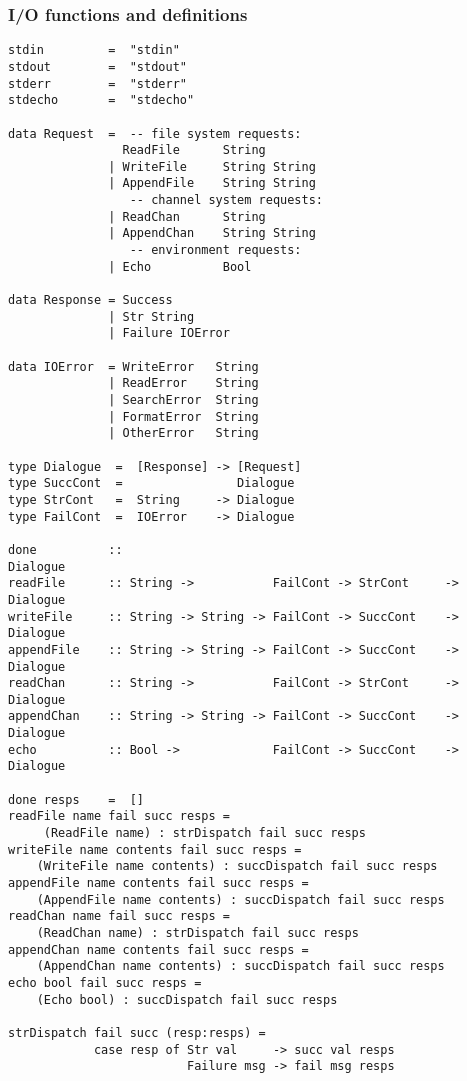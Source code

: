 \subsubsection*{I/O functions and definitions}
\begin{verbatim}
stdin         =  "stdin"
stdout        =  "stdout"
stderr        =  "stderr"
stdecho       =  "stdecho"

data Request  =  -- file system requests:
                ReadFile      String         
              | WriteFile     String String
              | AppendFile    String String
                 -- channel system requests:
              | ReadChan      String 
              | AppendChan    String String
                 -- environment requests:
              | Echo          Bool

data Response = Success
              | Str String 
              | Failure IOError

data IOError  = WriteError   String
              | ReadError    String
              | SearchError  String
              | FormatError  String
              | OtherError   String

type Dialogue  =  [Response] -> [Request]
type SuccCont  =                Dialogue
type StrCont   =  String     -> Dialogue
type FailCont  =  IOError    -> Dialogue
 
done          ::                                                Dialogue
readFile      :: String ->           FailCont -> StrCont     -> Dialogue
writeFile     :: String -> String -> FailCont -> SuccCont    -> Dialogue
appendFile    :: String -> String -> FailCont -> SuccCont    -> Dialogue
readChan      :: String ->           FailCont -> StrCont     -> Dialogue
appendChan    :: String -> String -> FailCont -> SuccCont    -> Dialogue
echo          :: Bool ->             FailCont -> SuccCont    -> Dialogue

done resps    =  []
readFile name fail succ resps =
     (ReadFile name) : strDispatch fail succ resps
writeFile name contents fail succ resps =
    (WriteFile name contents) : succDispatch fail succ resps
appendFile name contents fail succ resps =
    (AppendFile name contents) : succDispatch fail succ resps
readChan name fail succ resps =
    (ReadChan name) : strDispatch fail succ resps
appendChan name contents fail succ resps =
    (AppendChan name contents) : succDispatch fail succ resps
echo bool fail succ resps =
    (Echo bool) : succDispatch fail succ resps

strDispatch fail succ (resp:resps) = 
            case resp of Str val     -> succ val resps
                         Failure msg -> fail msg resps


\end{verbatim}
